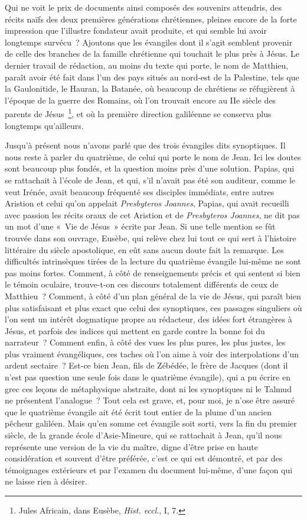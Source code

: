 \documentclass[french,twoside]{book} %
\begin{document}
Qui ne voit le prix de documents ainsi composés des souvenirs attendris, des récits naïfs des deux premières générations chrétiennes, pleines encore de la forte impression que l’illustre fondateur avait produite, et qui semble lui avoir longtemps survécu ? Ajoutons que les évangiles dont il s’agit semblent provenir de celle des branches de la famille chrétienne qui touchait le plus près à Jésus. Le dernier travail de rédaction, au moins du texte qui porte, le nom de Matthieu, paraît avoir été fait dans l’un des pays situés au nord-est de la Palestine, tels que la Gaulonitide, le Hauran, la Batanée, où beaucoup de chrétiens se réfugièrent à l’époque de la guerre des Romains, où l’on trouvait encore au IIe siècle des parents de Jésus \footnote{ Jules Africain, dans Eusèbe, {\itshape Hist. eccl}., I, 7.}, et où la première direction galiléenne se conserva plus longtemps qu’ailleurs.\par
Jusqu’à présent nous n’avons parlé que des trois évangiles dits synoptiques. Il nous reste à parler du quatrième, de celui qui porte le nom de Jean. Ici les doutes sont beaucoup plus fondés, et la question moins près d’une solution. Papias, qui se rattachait à l’école de Jean, et qui, s’il n’avait pas été son auditeur, comme le veut Irénée, avait beaucoup fréquenté ses disciples immédiats, entre autres Aristion et celui qu’on appelait {\itshape Presbyteros Joannes}, Papias, qui avait recueilli avec passion les récits oraux de cet Aristion et de {\itshape Presbyteros Joannes}, ne dit pas un mot d’une « Vie de Jésus » écrite par Jean. Si une telle mention se fût trouvée dans son ouvrage, Eusèbe, qui relève chez lui tout ce qui sert à l’histoire littéraire du siècle apostolique, en eût sans aucun doute fait la remarque. Les difficultés intrinsèques tirées de la lecture du quatrième évangile lui-même ne sont pas moins fortes. Comment, à côté de renseignements précis et qui sentent si bien le témoin oculaire, trouve-t-on ces discours totalement différents de ceux de Matthieu ? Comment, à côté d’un plan général de la vie de Jésus, qui paraît bien plus satisfaisant et plus exact que celui des synoptiques, ces passages singuliers où l’on sent un intérêt dogmatique propre au rédacteur, des idées fort étrangères à Jésus, et parfois des indices qui mettent en garde contre la bonne foi du narrateur ? Comment enfin, à côté des vues les plus pures, les plus justes, les plus vraiment évangéliques, ces taches où l’on aime à voir des interpolations d’un ardent sectaire ? Est-ce bien Jean, fils de Zébédée, le frère de Jacques (dont il n’est pas question une seule fois dans le quatrième évangile), qui a pu écrire en grec ces leçons de métaphysique abstraite, dont ni les synoptiques ni le Talmud ne présentent l’analogue ? Tout cela est grave, et, pour moi, je n’ose être assuré que le quatrième évangile ait été écrit tout entier de la plume d’un ancien pêcheur galiléen. Mais qu’en somme cet évangile soit sorti, vers la fin du premier siècle, de la grande école d’Asie-Mineure, qui se rattachait à Jean, qu’il nous représente une version de la vie du maître, digne d’être prise en haute considération et souvent d’être préférée, c’est ce qui est démontré, et par des témoignages extérieurs et par l’examen du document lui-même, d’une façon qui ne laisse rien à désirer.\par
\end{document}
